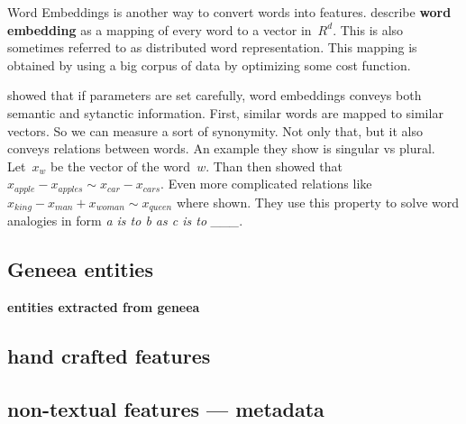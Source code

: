 Word Embeddings is another way to convert words into features.
\citet{LeGo14} describe {\bf word embedding} as a mapping of every word to a vector in~$R^d$.
This is also sometimes referred to as distributed word representation.
This mapping is obtained by using a big corpus of data by optimizing some cost function.

\citet{Mik13} showed that if parameters are set carefully, word embeddings conveys both semantic and sytanctic information.
First, similar words are mapped to similar vectors. So we can measure a sort of synonymity.
Not only that, but it also conveys relations between words.
An example they show is singular vs plural. Let~$x_{w}$ be the vector of the word~$w$.
Than then showed that $x_{apple}-x_{apples} \sim x_{car}-x_{cars}$.
Even more complicated relations like $x_{king} - x_{man} + x_{woman} \sim x_{queen}$ where shown.
They use this property to solve word analogies in form {\it a is to b as c is to \_\_\_}.


\subsection{Geneea entities}

\bf entities extracted from geneea \rm



\subsection{}


\subsection{hand crafted features}

\subsubsection{}

\subsubsection{}

\subsection{non-textual features --- metadata}


